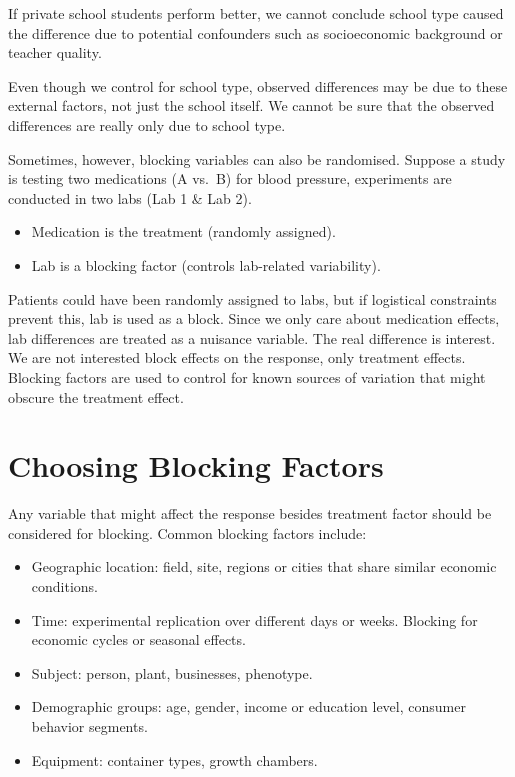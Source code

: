 \documentclass[
  letterpaper,
]{book}
\providecommand{\tightlist}{%
  \setlength{\itemsep}{0pt}\setlength{\parskip}{0pt}}\usepackage{longtable,booktabs,array}
\begin{document}
If private school students perform better, we cannot conclude school
type caused the difference due to potential confounders such as
socioeconomic background or teacher quality.

Even though we control for school type, observed differences may be due
to these external factors, not just the school itself. We cannot be sure
that the observed differences are really only due to school type.

Sometimes, however, blocking variables can also be randomised. Suppose a
study is testing two medications (A vs.~B) for blood pressure,
experiments are conducted in two labs (Lab 1 \& Lab 2).

\begin{itemize}
\tightlist
\item
  Medication is the treatment (randomly assigned).\\
\item
  Lab is a blocking factor (controls lab-related variability).
\end{itemize}

Patients could have been randomly assigned to labs, but if logistical
constraints prevent this, lab is used as a block. Since we only care
about medication effects, lab differences are treated as a nuisance
variable. The real difference is interest. We are not interested block
effects on the response, only treatment effects. Blocking factors are
used to control for known sources of variation that might obscure the
treatment effect.

\section{Choosing Blocking Factors}\label{choosing-blocking-factors}

Any variable that might affect the response besides treatment factor
should be considered for blocking. Common blocking factors include:

\begin{itemize}
\tightlist
\item
  Geographic location: field, site, regions or cities that share similar
  economic conditions.
\item
  Time: experimental replication over different days or weeks. Blocking
  for economic cycles or seasonal effects.
\item
  Subject: person, plant, businesses, phenotype.
\item
  Demographic groups: age, gender, income or education level, consumer
  behavior segments.\\
\item
  Equipment: container types, growth chambers.
\end{itemize}
\end{document}
